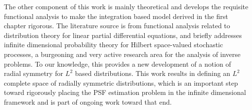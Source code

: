 \indent
The other component of this work is mainly theoretical and develops the requisite functional analysis to make the integration based model derived in the first chapter rigorous.
The literature source is from functional analysis related to distribution theory for linear partial differential equations, and briefly addresses infinite dimensional probability theory for Hilbert space-valued stochastic processes, a burgeoning and very active research area for the analysis of inverse problems.
To our knowledge, this provides a new development of a notion of radial symmetry for $L^2$ based distributions.
This work results in defining an $L^2$ complete space of radially symmetric distributions, which is an important step toward rigorously placing the PSF estimation problem in the infinite dimensional framework and is part of ongoing work toward that end.

\pagebreak
